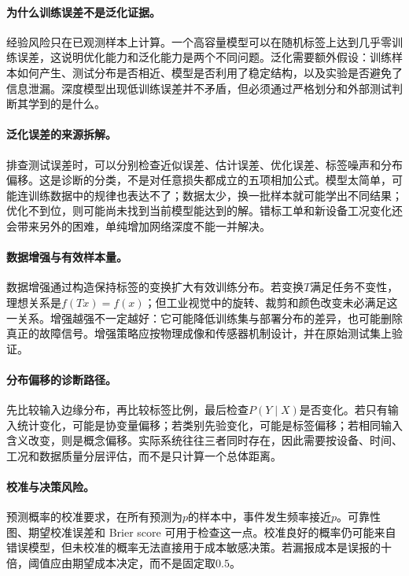 \paragraph{为什么训练误差不是泛化证据。}
经验风险只在已观测样本上计算。一个高容量模型可以在随机标签上达到几乎零训练误差，这说明优化能力和泛化能力是两个不同问题。泛化需要额外假设：训练样本如何产生、测试分布是否相近、模型是否利用了稳定结构，以及实验是否避免了信息泄漏。深度模型出现低训练误差并不矛盾，但必须通过严格划分和外部测试判断其学到的是什么。

\paragraph{泛化误差的来源拆解。}
排查测试误差时，可以分别检查近似误差、估计误差、优化误差、标签噪声和分布偏移。这是诊断的分类，不是对任意损失都成立的五项相加公式。模型太简单，可能连训练数据中的规律也表达不了；数据太少，换一批样本就可能学出不同结果；优化不到位，则可能尚未找到当前模型能达到的解。错标工单和新设备工况变化还会带来另外的困难，单纯增加网络深度不能一并解决。

\paragraph{数据增强与有效样本量。}
数据增强通过构造保持标签的变换扩大有效训练分布。若变换$T$满足任务不变性，理想关系是$f(Tx)=f(x)$；但工业视觉中的旋转、裁剪和颜色改变未必满足这一关系。增强越强不一定越好：它可能降低训练集与部署分布的差异，也可能删除真正的故障信号。增强策略应按物理成像和传感器机制设计，并在原始测试集上验证。

\paragraph{分布偏移的诊断路径。}
先比较输入边缘分布，再比较标签比例，最后检查$P(Y\mid X)$是否变化。若只有输入统计变化，可能是协变量偏移；若类别先验变化，可能是标签偏移；若相同输入含义改变，则是概念偏移。实际系统往往三者同时存在，因此需要按设备、时间、工况和数据质量分层评估，而不是只计算一个总体距离。

\paragraph{校准与决策风险。}
预测概率的校准要求，在所有预测为$p$的样本中，事件发生频率接近$p$。可靠性图、期望校准误差和 Brier score 可用于检查这一点。校准良好的概率仍可能来自错误模型，但未校准的概率无法直接用于成本敏感决策。若漏报成本是误报的十倍，阈值应由期望成本决定，而不是固定取$0.5$。

